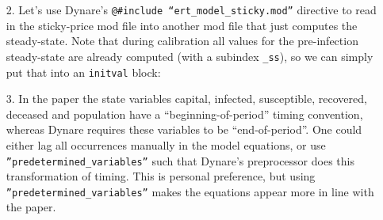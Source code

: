 \begin{itemize}

    \item[2.] Let's use Dynare's \texttt{@\#include ``ert\_model\_sticky.mod''} directive to read in the sticky-price mod file into another mod file that just computes the steady-state.
Note that during calibration all values for the pre-infection steady-state are already computed (with a subindex \texttt{\_ss}),
  so we can simply put that into an \texttt{initval} block:


\item[3.] In the paper the state variables capital, infected, susceptible, recovered, deceased and population
  have a ``beginning-of-period'' timing convention,
  whereas Dynare requires these variables to be ``end-of-period''.
One could either lag all occurrences manually in the model equations,
  or use \texttt{''predetermined\_variables''} such that Dynare's preprocessor does this transformation of timing.
This is personal preference, but using \texttt{''predetermined\_variables''} makes the equations appear more in line with the paper.


\end{itemize}
